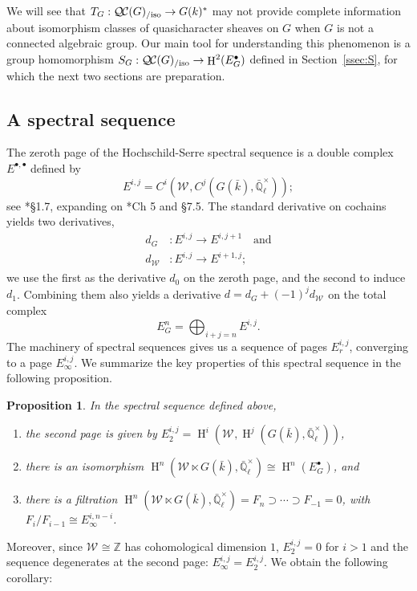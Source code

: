 \documentclass[10pt]{amsart}
\theoremstyle{plain}
\newtheorem{proposition}[theorem]{Proposition}
\theoremstyle{definition}
\theoremstyle{remark}
\newcommand{\ZZ}{{\mathbb{Z}}}
\newcommand{\EE}{\mathbb{\bar Q}_\ell}
\newcommand{\bFq}{\bar{k}}
\newcommand{\Fq}{k}
\newcommand{\EEx}{\EE^\times}
\newcommand{\Weil}[1]{\mathcal{W}_{#1}}
\DeclareMathOperator{\Hh}{H}
\newcommand{\TrFrob}[1]{T_{#1}}
\newcommand{\QC}{{\mathcal{Q\hskip-0.8pt C}}}
\newcommand{\QCiso}[1]{\QC(#1)_{/\text{iso}}}
\begin{document}
We will see that $\TrFrob{G} : \QCiso{G} \to G(\Fq)^*$ may not provide complete
information about isomorphism classes of quasicharacter sheaves on $G$ when $G$ is not a connected algebraic group.
Our main tool for understanding this phenomenon
is a group homomorphism $S_G: \QCiso{G} \to \Hh^2(E^\bullet_G)$ defined in Section~\ref{ssec:S}, for which the next two sections are preparation.

\subsection{A spectral sequence}\label{ssec:E}

The zeroth page of the Hochschild-Serre spectral sequence
is a double complex $E^{\bullet, \bullet}$ defined by
\[
E^{i,j} = C^i(\Weil{}, C^j(G(\bFq), \EEx));
\]
see \cite{vakil:Algebraic_Geometry}*{\S 1.7}, expanding on \cite{weibel:Homological_Algebra}*{Ch 5 and \S 7.5}.
The standard derivative on cochains yields two derivatives,
\begin{align*}
d_G &: E^{i,j} \to E^{i,j+1} \quad \mbox{and} \\
d_{\Weil{}} &: E^{i,j} \to E^{i+1,j};
\end{align*}
we use the first as the derivative $d_0$ on the zeroth page, and the second to induce $d_1$.
Combining them also yields a derivative $d = d_G + (-1)^j d_{\Weil{}}$ on the total complex
\[
E^n_G = \bigoplus_{i+j=n} E^{i,j}.
\]
The machinery of spectral sequences gives us a sequence of pages $E_r^{i,j}$, converging to a page $E_{\infty}^{i,j}$. We summarize the key properties of this spectral sequence in the following proposition.

\begin{proposition} In the spectral sequence defined above,
\begin{enumerate}
\item the second page is given by $E_2^{i,j} = \Hh^i(\Weil{}, \Hh^j(G(\bFq), \EEx))$,
\item there is an isomorphism $\Hh^n(\Weil{} \ltimes G(\bFq), \EEx) \cong \Hh^n(E_G^\bullet)$, and
\item there is a filtration $\Hh^n(\Weil{} \ltimes G(\bFq), \EEx) = F_n \supset \cdots \supset F_{-1} = 0$, with $F_i / F_{i-1} \cong E_{\infty}^{i, n-i}$.
\end{enumerate}
\end{proposition}

Moreover, since $\Weil{} \cong \ZZ$ has cohomological dimension $1$, $E_2^{i,j} = 0$ for $i > 1$ and the sequence degenerates at the second page: $E_{\infty}^{i,j} = E_2^{i,j}$. We obtain the following corollary:
\end{document}
